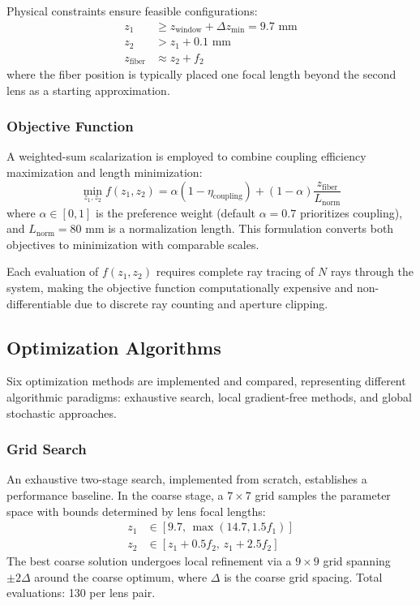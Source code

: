 Physical constraints ensure feasible configurations:
\begin{align}
z_1 &\geq z_{\text{window}} + \Delta z_{\text{min}} = 9.7\text{ mm} \\
z_2 &> z_1 + 0.1\text{ mm} \\
z_{\text{fiber}} &\approx z_2 + f_2
\end{align}
where the fiber position is typically placed one focal length beyond the second lens as a starting approximation.

\subsubsection{Objective Function}

A weighted-sum scalarization is employed to combine coupling efficiency maximization and length minimization:
\begin{equation}
\min_{z_1,z_2} f(z_1, z_2) = \alpha(1 - \eta_{\text{coupling}}) + (1-\alpha)\frac{z_{\text{fiber}}}{L_{\text{norm}}}
\end{equation}
where $\alpha \in [0,1]$ is the preference weight (default $\alpha = 0.7$ prioritizes coupling), and $L_{\text{norm}} = 80$ mm is a normalization length. This formulation converts both objectives to minimization with comparable scales.

Each evaluation of $f(z_1, z_2)$ requires complete ray tracing of $N$ rays through the system, making the objective function computationally expensive and non-differentiable due to discrete ray counting and aperture clipping.

\subsection{Optimization Algorithms}

Six optimization methods are implemented and compared, representing different algorithmic paradigms: exhaustive search, local gradient-free methods, and global stochastic approaches.

\subsubsection{Grid Search}

An exhaustive two-stage search, implemented from scratch, establishes a performance baseline. In the coarse stage, a $7 \times 7$ grid samples the parameter space with bounds determined by lens focal lengths:
\begin{align}
z_1 &\in [9.7, \, \max(14.7, 1.5f_1)] \\
z_2 &\in [z_1 + 0.5f_2, \, z_1 + 2.5f_2]
\end{align}
The best coarse solution undergoes local refinement via a $9 \times 9$ grid spanning $\pm 2\Delta$ around the coarse optimum, where $\Delta$ is the coarse grid spacing. Total evaluations: 130 per lens pair.

